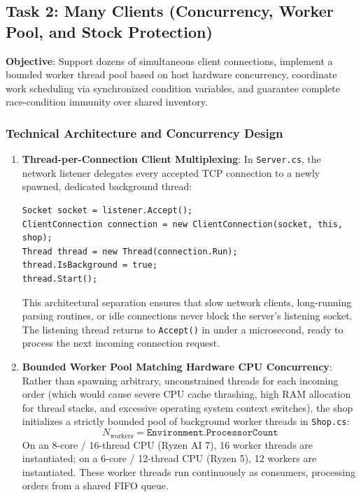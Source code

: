 \documentclass[11pt,a4paper]{article}
\begin{document}
\subsection{Task 2: Many Clients (Concurrency, Worker Pool, and Stock Protection)}
\textbf{Objective}: Support dozens of simultaneous client connections, implement a bounded worker thread pool based on host hardware concurrency, coordinate work scheduling via synchronized condition variables, and guarantee complete race-condition immunity over shared inventory.

\subsubsection{Technical Architecture and Concurrency Design}
\begin{enumerate}
    \item \textbf{Thread-per-Connection Client Multiplexing}:
    In \texttt{Server.cs}, the network listener delegates every accepted TCP connection to a newly spawned, dedicated background thread:
    \begin{lstlisting}[language={[Sharp]C}]
Socket socket = listener.Accept();
ClientConnection connection = new ClientConnection(socket, this, shop);
Thread thread = new Thread(connection.Run);
thread.IsBackground = true;
thread.Start();
    \end{lstlisting}
    This architectural separation ensures that slow network clients, long-running parsing routines, or idle connections never block the server's listening socket. The listening thread returns to \texttt{Accept()} in under a microsecond, ready to process the next incoming connection request.

    \item \textbf{Bounded Worker Pool Matching Hardware CPU Concurrency}:
    Rather than spawning arbitrary, unconstrained threads for each incoming order (which would cause severe CPU cache thrashing, high RAM allocation for thread stacks, and excessive operating system context switches), the shop initializes a strictly bounded pool of background worker threads in \texttt{Shop.cs}:
    $$N_{\text{workers}} = \texttt{Environment.ProcessorCount}$$
    On an 8-core / 16-thread CPU (Ryzen AI 7), 16 worker threads are instantiated; on a 6-core / 12-thread CPU (Ryzen 5), 12 workers are instantiated. These worker threads run continuously as consumers, processing orders from a shared FIFO queue.


\end{enumerate}
\end{document}
